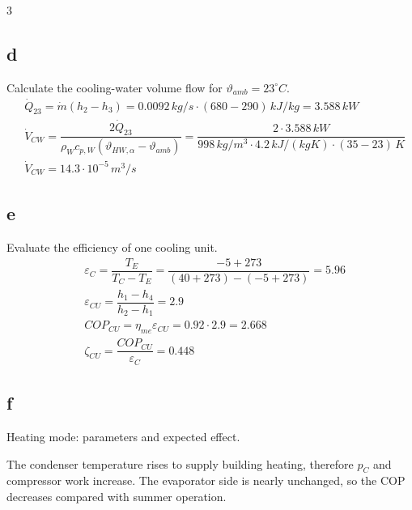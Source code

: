 \documentclass[9pt, landscape, a4paper]{article}
\begin{document}
\begin{multicols*}{3}
\subsection*{d}
Calculate the cooling-water volume flow for $\vartheta_{amb}=23^\circ C$.
\begingroup
\scriptsize
\begin{align*}
  & \dot Q_{23}=\dot m\left(h_2-h_3\right)
  =0.0092\,kg/s\cdot(680-290)\,kJ/kg=3.588\,kW\\[.8ex]
  & \dot V_{CW}
  =\dfrac{2\dot Q_{23}}{\rho_Wc_{p,W}\left(\vartheta_{HW,\alpha}-\vartheta_{amb}\right)}
  =\dfrac{2\cdot3.588\,kW}{998\,kg/m^3\cdot4.2\,kJ/(kgK)\cdot(35-23)\,K}\\
  & \dot V_{CW}=14.3\cdot10^{-5}\,m^3/s
\end{align*}
\endgroup

\subsection*{e}
Evaluate the efficiency of one cooling unit.
\begingroup
\scriptsize
\begin{align*}
  & \varepsilon_C=\dfrac{T_E}{T_C-T_E}
  =\dfrac{-5+273}{(40+273)-(-5+273)}=5.96\\[.8ex]
  & \varepsilon_{CU}=\dfrac{h_1-h_4}{h_2-h_1}=2.9\\[.8ex]
  & COP_{CU}=\eta_{me}\varepsilon_{CU}=0.92\cdot2.9=2.668\\[.8ex]
  & \zeta_{CU}=\dfrac{COP_{CU}}{\varepsilon_C}=0.448
\end{align*}
\endgroup

\subsection*{f}
Heating mode: parameters and expected effect.

The condenser temperature rises to supply building heating, therefore $p_C$ and
compressor work increase. The evaporator side is nearly unchanged, so the COP
decreases compared with summer operation.
\end{multicols*}
\end{document}

